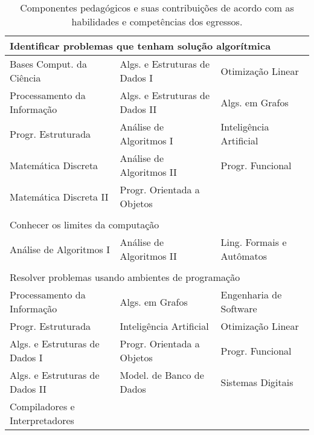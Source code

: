 \begin{longtable}{|p{}p{}p{}|}
    \caption{Componentes pedagógicos e suas contribuições de acordo com as habilidades e competências dos egressos.}
    \label{tab:mapeamento_competencias}
    \endfirsthead
    \endhead

    \multicolumn{3}{p{0.95\textwidth}}{Identificar problemas que tenham solução algorítmica}\\
    \hline
    \textcolor{nred}{Bases Comput. da Ciência}  &
    \textcolor{nblue}{Algs. e Estruturas de Dados I} &
    \textcolor{nyellow}{Otimização Linear} \\
    \textcolor{nred}{Processamento da Informação} &
    \textcolor{nblue}{Algs. e Estruturas de Dados II} &
    \textcolor{nblue}{Algs. em Grafos} \\
    \textcolor{nblue}{Progr. Estruturada} &
    \textcolor{nblue}{Análise de Algoritmos I} &
    \textcolor{nblue}{Inteligência Artificial} \\
    \textcolor{nblue}{Matemática Discreta} &
    \textcolor{nblue}{Análise de Algoritmos II} &
    \textcolor{nblue}{Progr. Funcional} \\
    \textcolor{nblue}{Matemática Discreta II} &
    \textcolor{nblue}{Progr. Orientada a Objetos} & \\

    \hline
    \multicolumn{3}{p{0.95\textwidth}}{}\\
    
    \multicolumn{3}{p{0.95\textwidth}}{Conhecer os limites da computação}\\
    \hline
    \textcolor{nblue}{Análise de Algoritmos I} &
    \textcolor{nblue}{Análise de Algoritmos II} &
    \textcolor{nblue}{Ling. Formais e Autômatos} \\

    \hline
    \multicolumn{3}{p{0.95\textwidth}}{}\\

    \multicolumn{3}{p{0.95\textwidth}}{Resolver problemas usando ambientes de programação}\\
    \hline
    \textcolor{nred}{Processamento da Informação} &
    \textcolor{nblue}{Algs. em Grafos} &
    \textcolor{nblue}{Engenharia de Software} \\
    \textcolor{nblue}{Progr. Estruturada} &
    \textcolor{nblue}{Inteligência Artificial} &
    \textcolor{nyellow}{Otimização Linear}\\
    \textcolor{nblue}{Algs. e Estruturas de Dados I} &
    \textcolor{nblue}{Progr. Orientada a Objetos} &
    \textcolor{nblue}{Progr. Funcional}\\
    \textcolor{nblue}{Algs. e Estruturas de Dados II} &
    \textcolor{nblue}{\small Model. de Banco de Dados} &
    \textcolor{nblue}{Sistemas Digitais}\\
    \textcolor{nblue}{Compiladores e Interpretadores} & & \\
    \hline
    

\end{longtable}
